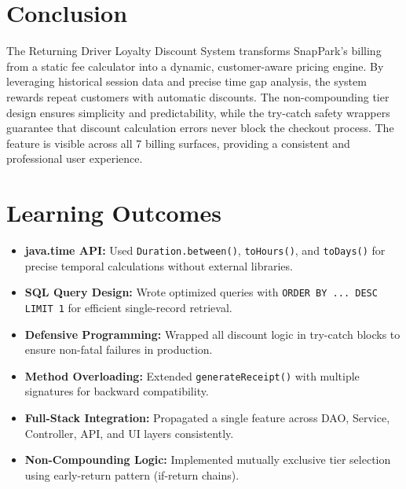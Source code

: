 \documentclass[12pt,a4paper]{article}
\begin{document}
\section{Conclusion}

The Returning Driver Loyalty Discount System transforms SnapPark's billing from a static fee calculator into a dynamic, customer-aware pricing engine. By leveraging historical session data and precise time gap analysis, the system rewards repeat customers with automatic discounts. The non-compounding tier design ensures simplicity and predictability, while the try-catch safety wrappers guarantee that discount calculation errors never block the checkout process. The feature is visible across all 7 billing surfaces, providing a consistent and professional user experience.

\section{Learning Outcomes}

\begin{itemize}
    \item \textbf{java.time API:} Used \texttt{Duration.between()}, \texttt{toHours()}, and \texttt{toDays()} for precise temporal calculations without external libraries.
    \item \textbf{SQL Query Design:} Wrote optimized queries with \texttt{ORDER BY ... DESC LIMIT 1} for efficient single-record retrieval.
    \item \textbf{Defensive Programming:} Wrapped all discount logic in try-catch blocks to ensure non-fatal failures in production.
    \item \textbf{Method Overloading:} Extended \texttt{generateReceipt()} with multiple signatures for backward compatibility.
    \item \textbf{Full-Stack Integration:} Propagated a single feature across DAO, Service, Controller, API, and UI layers consistently.
    \item \textbf{Non-Compounding Logic:} Implemented mutually exclusive tier selection using early-return pattern (if-return chains).
\end{itemize}
\end{document}
